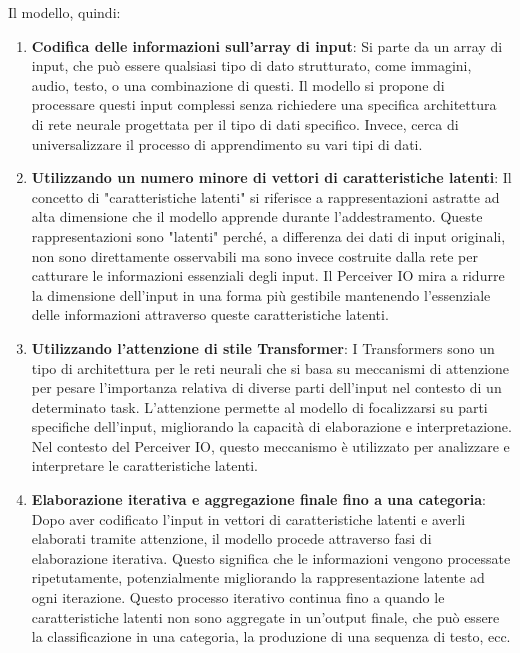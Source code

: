 \documentclass[
  11pt,
]{article}
\begin{document}
Il modello, quindi:

\begin{enumerate}
\def\labelenumi{\arabic{enumi}.}
\item
  \textbf{Codifica delle informazioni sull'array di
  input}: Si parte da un array di input, che può essere qualsiasi tipo
  di dato strutturato, come immagini, audio, testo, o una combinazione
  di questi. Il modello si propone di processare questi input complessi
  senza richiedere una specifica architettura di rete neurale progettata
  per il tipo di dati specifico. Invece, cerca di universalizzare il
  processo di apprendimento su vari tipi di dati.
\item
  \textbf{Utilizzando un numero minore di vettori di caratteristiche
  latenti}: Il concetto di "caratteristiche latenti" si riferisce a
  rappresentazioni astratte ad alta dimensione che il modello apprende
  durante l'addestramento. Queste rappresentazioni sono
  "latenti" perché, a differenza dei dati di input originali, non sono
  direttamente osservabili ma sono invece costruite dalla rete per
  catturare le informazioni essenziali degli input. Il Perceiver IO mira
  a ridurre la dimensione dell'input in una forma più
  gestibile mantenendo l'essenziale delle informazioni
  attraverso queste caratteristiche latenti.
\item
  \textbf{Utilizzando l'attenzione di stile
  Transformer}: I Transformers sono un tipo di architettura per le reti
  neurali che si basa su meccanismi di attenzione per pesare
  l'importanza relativa di diverse parti
  dell'input nel contesto di un determinato task.
  L'attenzione permette al modello di focalizzarsi su
  parti specifiche dell'input, migliorando la capacità
  di elaborazione e interpretazione. Nel contesto del Perceiver IO,
  questo meccanismo è utilizzato per analizzare e interpretare le
  caratteristiche latenti.
\item
  \textbf{Elaborazione iterativa e aggregazione finale fino a una
  categoria}: Dopo aver codificato l'input in vettori di
  caratteristiche latenti e averli elaborati tramite attenzione, il
  modello procede attraverso fasi di elaborazione iterativa. Questo
  significa che le informazioni vengono processate ripetutamente,
  potenzialmente migliorando la rappresentazione latente ad ogni
  iterazione. Questo processo iterativo continua fino a quando le
  caratteristiche latenti non sono aggregate in
  un'output finale, che può essere la classificazione in
  una categoria, la produzione di una sequenza di testo, ecc.
\end{enumerate}
\end{document}

